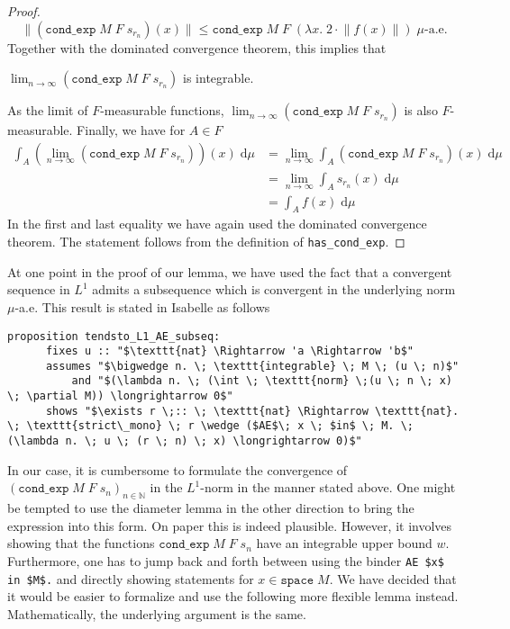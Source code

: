 \begin{proof}
	\[
		\lVert (\texttt{cond\_exp} \; M \; F \; s_{r_n}) (x) \rVert \le \texttt{cond\_exp} \; M \; F \; (\lambda x. \; 2 \cdot \lVert f(x)\rVert) \; \mu\textrm{-a.e.}
	\]
	Together with the dominated convergence theorem, this implies that \par\noindent$\lim_{n \to \infty} (\texttt{cond\_exp} \; M \; F \; s_{r_n})$ is integrable. \par\noindent As the limit of $F$-measurable functions, $\lim_{n \to \infty} (\texttt{cond\_exp} \; M \; F \; s_{r_n})$ is also $F$-measurable. Finally, we have for $A \in F$
	\begin{align*}
		\int_A (\lim_{n \to \infty} (\texttt{cond\_exp} \; M \; F \; s_{r_n}))(x) \; \textrm{d}\mu &= \lim_{n \to \infty} \int_A (\texttt{cond\_exp} \; M \; F \; s_{r_n})(x) \; \textrm{d}\mu \\
		&= \lim_{n \to \infty} \int_A s_{r_n}(x) \; \textrm{d}\mu \\
		&= \int_A f(x) \; \textrm{d}\mu 
	\end{align*}
	In the first and last equality we have again used the dominated convergence theorem. The statement follows from the definition of \texttt{has\_cond\_exp}.
\end{proof}

At one point in the proof of our lemma, we have used the fact that a convergent sequence in $L^1$ admits a subsequence which is convergent in the underlying norm $\mu$-a.e. This result is stated in Isabelle as follows

{\small
	\begin{lstlisting}[style=isabelle]
	proposition tendsto_L1_AE_subseq:
	  fixes u :: "$\texttt{nat} \Rightarrow 'a \Rightarrow 'b$"
	  assumes "$\bigwedge n. \; \texttt{integrable} \; M \; (u \; n)$"
		  and "$(\lambda n. \; (\int \; \texttt{norm} \;(u \; n \; x) \; \partial M)) \longrightarrow 0$"
	  shows "$\exists r \;:: \; \texttt{nat} \Rightarrow \texttt{nat}. \; \texttt{strict\_mono} \; r \wedge ($AE$\; x \; $in$ \; M. \; (\lambda n. \; u \; (r \; n) \; x) \longrightarrow 0)$"
	\end{lstlisting}
}

In our case, it is cumbersome to formulate the convergence of $(\texttt{cond\_exp} \; M \; F \; s_n)_{n \in \mathbb{N}}$ in the $L^1$-norm in the manner stated above. One might be tempted to use the diameter lemma in the other direction to bring the expression into this form. On paper this is indeed plausible. However, it involves showing that the functions $\texttt{cond\_exp} \; M \; F \; s_n$ have an integrable upper bound $w$. Furthermore, one has to jump back and forth between using the binder \lstinline[mathescape]{AE $x$ in $M$.} and directly showing statements for $x \in \texttt{space} \; M$. We have decided that it would be easier to formalize and use the following more flexible lemma instead. Mathematically, the underlying argument is the same.

